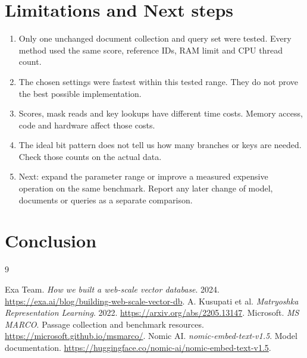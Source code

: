 \newpage
\section{Limitations and Next steps}
\begin{enumerate}
\item Only one unchanged document collection and query set were tested. Every method used the same score, reference IDs, RAM limit and CPU thread count.
\item The chosen settings were fastest within this tested range. They do not prove the best possible implementation.
\item Scores, mask reads and key lookups have different time costs. Memory access, code and hardware affect those costs.
\item The ideal bit pattern does not tell us how many branches or keys are needed. Check those counts on the actual data.
\item Next: expand the parameter range or improve a measured expensive operation on the same benchmark. Report any later change of model, documents or queries as a separate comparison.
\end{enumerate}

\section{Conclusion}


\begin{thebibliography}{9}\small\raggedright
{} Exa Team. \emph{How we built a web-scale vector database}. 2024.
\url{https://exa.ai/blog/building-web-scale-vector-db}.
 A. Kusupati et al. \emph{Matryoshka Representation Learning}. 2022.
\url{https://arxiv.org/abs/2205.13147}.
 Microsoft. \emph{MS MARCO}. Passage collection and benchmark resources.
\url{https://microsoft.github.io/msmarco/}.
 Nomic AI. \emph{nomic-embed-text-v1.5}. Model documentation.
\url{https://huggingface.co/nomic-ai/nomic-embed-text-v1.5}.
\end{thebibliography}
